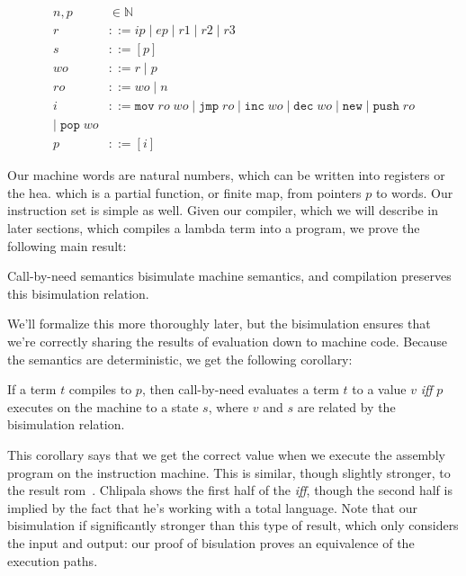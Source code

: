 \begin{align}
  \tag{Word}   n, p &\in \mathbb{N} \\
  \tag{Registers} r &::= ip \; | \; ep \; | \; r1 \; | \; r2 \; | \; r3 \\
  \tag{Stack}     s &::= [p] \\
  \tag{Write Operands}  wo &::= r \; | \; p \\
  \tag{Read Operands}  ro &::= wo \; | \; n \\
  \tag{Instructions} i &::= \texttt{mov} \; ro \; wo \; 
                       | \; \texttt{jmp} \; ro \; 
                       | \; \texttt{inc} \; wo \;
                       | \; \texttt{dec} \; wo \;
                       | \; \texttt{new} \;  
                       | \; \texttt{push} \; ro \\
                       | \; \texttt{pop} \; wo \\
  \tag{Program}   p &::= [i]
\end{align}

Our machine words are natural numbers, which can be written into registers or
the hea. which is a partial function, or finite map, from pointers $p$ to
words. Our instruction set is simple as well. Given our compiler, which we will
describe in later sections, which compiles a lambda term into a program, we
prove the following main result:

\begin{theorem}
Call-by-need semantics bisimulate machine semantics, and compilation
preserves this bisimulation relation.
\end{theorem}

We'll formalize this more thoroughly later, but the bisimulation ensures that
we're correctly sharing the results of evaluation down to machine code. Because
the semantics are deterministic, we get the following corollary:   

\begin{corollary}
If a term $t$ compiles to $p$, then call-by-need evaluates a term $t$ to a value
$v$ \emph{iff} $p$ executes on the machine to a state $s$, where $v$ and $s$ are
related by the bisimulation relation.
\end{corollary}

This corollary says that we get the correct value when we execute the assembly
program on the instruction machine. This is similar, though slightly stronger,
to the result rom~\cite{chlipala2007certified}. Chlipala shows the first half of
the \emph{iff}, though the second half is implied by the fact that he's working
with a total language. Note that our bisimulation if significantly stronger than
this type of result, which only considers the input and output: our proof of
bisulation proves an equivalence of the execution paths.

